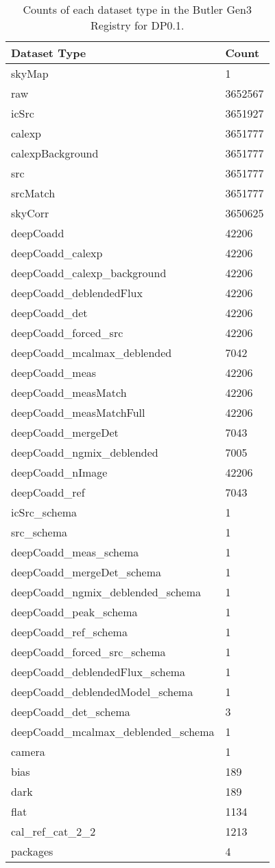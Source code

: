 \begin{table}[H]
\centering
\begin{tabular} {|l|l|}
\hline
{Dataset Type}&{Count} \\ \hline
skyMap & 1 \\
raw & 3652567 \\
icSrc & 3651927 \\
calexp & 3651777 \\
calexpBackground & 3651777 \\
src & 3651777 \\
srcMatch & 3651777 \\
skyCorr & 3650625 \\
deepCoadd & 42206 \\
deepCoadd\_calexp & 42206 \\
deepCoadd\_calexp\_background & 42206 \\
deepCoadd\_deblendedFlux & 42206 \\
deepCoadd\_det & 42206 \\
deepCoadd\_forced\_src & 42206 \\
deepCoadd\_mcalmax\_deblended & 7042 \\
deepCoadd\_meas & 42206 \\
deepCoadd\_measMatch & 42206 \\
deepCoadd\_measMatchFull & 42206 \\
deepCoadd\_mergeDet & 7043 \\
deepCoadd\_ngmix\_deblended & 7005 \\
deepCoadd\_nImage & 42206 \\
deepCoadd\_ref & 7043 \\
icSrc\_schema & 1 \\
src\_schema & 1 \\
deepCoadd\_meas\_schema & 1 \\
deepCoadd\_mergeDet\_schema & 1 \\
deepCoadd\_ngmix\_deblended\_schema & 1 \\
deepCoadd\_peak\_schema & 1 \\
deepCoadd\_ref\_schema & 1 \\
deepCoadd\_forced\_src\_schema & 1 \\
deepCoadd\_deblendedFlux\_schema & 1 \\
deepCoadd\_deblendedModel\_schema & 1 \\
deepCoadd\_det\_schema & 3 \\
deepCoadd\_mcalmax\_deblended\_schema & 1 \\
camera & 1 \\
bias & 189 \\
dark & 189 \\
flat & 1134 \\
cal\_ref\_cat\_2\_2 & 1213 \\
packages & 4 \\
\hline
\end{tabular}
\caption{Counts of each dataset type in the Butler Gen3 Registry for DP0.1.}
\end{table}
\label{tab:dp01}
